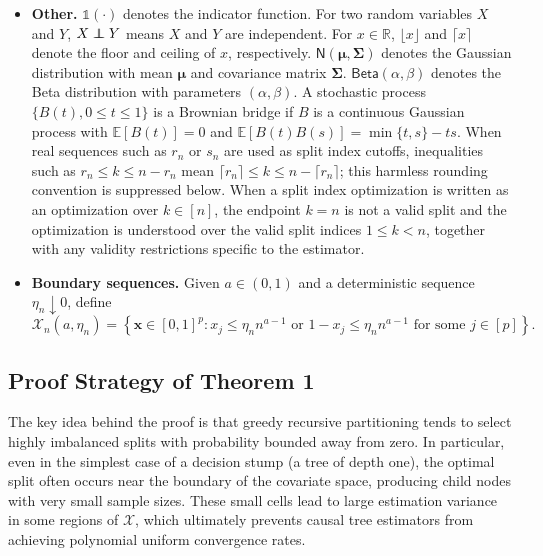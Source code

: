 \documentclass[10pt]{article}
\newcommand\independent{\protect\mathpalette{\protect\independenT}{\perp}}
\def\independenT#1#2{\mathrel{\rlap{$#1#2$}\mkern2mu{#1#2}}}
\def\bx{\mathbf{x}}
\def\E{\mathbb{E}}
\def\reals{\mathbb{R}}
\newcommand{\Indicator}{\mathds{1}}
\theoremstyle{definition}
\theoremstyle{remark}
\begin{document}
\begin{itemize}
    \item \textbf{Other.}
$\Indicator(\cdot)$ denotes the indicator function. For two random variables $X$ and $Y$, $X \independent Y$ means $X$ and $Y$ are independent. For $x \in \reals$, $\lfloor x \rfloor$ and $\lceil x \rceil$ denote the floor and ceiling of $x$, respectively. $\mathsf{N}(\boldsymbol{\mu}, \boldsymbol{\Sigma})$ denotes the Gaussian distribution with mean $\boldsymbol{\mu}$ and covariance matrix $\boldsymbol{\Sigma}$. $\mathsf{Beta}(\alpha, \beta)$ denotes the Beta distribution with parameters $(\alpha, \beta)$. A stochastic process $\{B(t), 0 \leq t \leq 1\}$ is a Brownian bridge if $B$ is a continuous Gaussian process with $\E[B(t)] = 0$ and $\E[B(t)B(s)] = \min\{t,s\} - ts$.
When real sequences such as $r_n$ or $s_n$ are used as split index cutoffs, inequalities such as $r_n\leq k\leq n-r_n$ mean $\lceil r_n\rceil\leq k\leq n-\lceil r_n\rceil$; this harmless rounding convention is suppressed below.
When a split index optimization is written as an optimization over $k\in[n]$, the endpoint $k=n$ is not a valid split and the optimization is understood over the valid split indices $1\leq k<n$, together with any validity restrictions specific to the estimator.

    \item \textbf{Boundary sequences.}
Given $a\in(0,1)$ and a deterministic sequence $\eta_n\downarrow 0$, define
\[
    \mathcal{X}_n(a,\eta_n)
    =
    \left\{\bx\in[0,1]^p:
    x_j \leq \eta_n n^{a-1}
    \text{ or }
    1-x_j \leq \eta_n n^{a-1}
    \text{ for some }j\in[p]\right\}.
\]
\end{itemize}

\endgroup

\subsection{Proof Strategy of Theorem 1}\label{sec: Proof Strategy of Theorem 1}

The key idea behind the proof is that greedy recursive partitioning tends to select highly imbalanced splits with probability bounded away from zero. In particular, even in the simplest case of a decision stump (a tree of depth one), the optimal split often occurs near the boundary of the covariate space, producing child nodes with very small sample sizes. These small cells lead to large estimation variance in some regions of $\mathcal{X}$, which ultimately prevents causal tree estimators from achieving polynomial uniform convergence rates.
\end{document}
